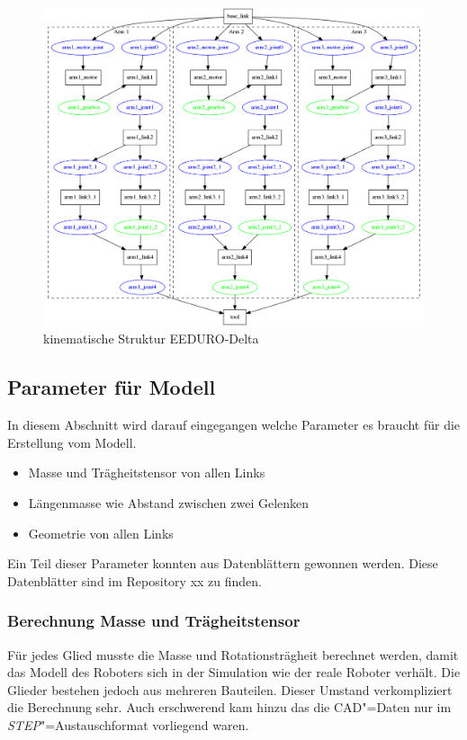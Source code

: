 \begin{figure}[ht!]
	\centering
	\includegraphics[width=12cm]{images/delta_struktur.png}
	\caption{kinematische Struktur EEDURO-Delta}
	\label{Ab:delta-struktur}
\end{figure}

\subsection{Parameter für Modell}
In diesem Abschnitt wird darauf eingegangen welche Parameter es braucht für die Erstellung vom Modell.
\begin{itemize}
\item Masse und Trägheitstensor von allen Links
\item Längenmasse wie Abstand zwischen zwei Gelenken
\item Geometrie von allen Links
\end{itemize}

Ein Teil dieser Parameter konnten aus Datenblättern gewonnen werden.
Diese Datenblätter sind im Repository xx zu finden. %

\subsubsection{Berechnung Masse und Trägheitstensor}
Für jedes Glied musste die Masse und Rotationsträgheit berechnet werden, damit das Modell des Roboters sich in der Simulation wie der reale Roboter verhält.
Die Glieder bestehen jedoch aus mehreren Bauteilen.
Dieser Umstand verkompliziert die Berechnung sehr.
Auch erschwerend kam hinzu das die CAD"=Daten nur im \textit{STEP}"=Austauschformat vorliegend waren.

